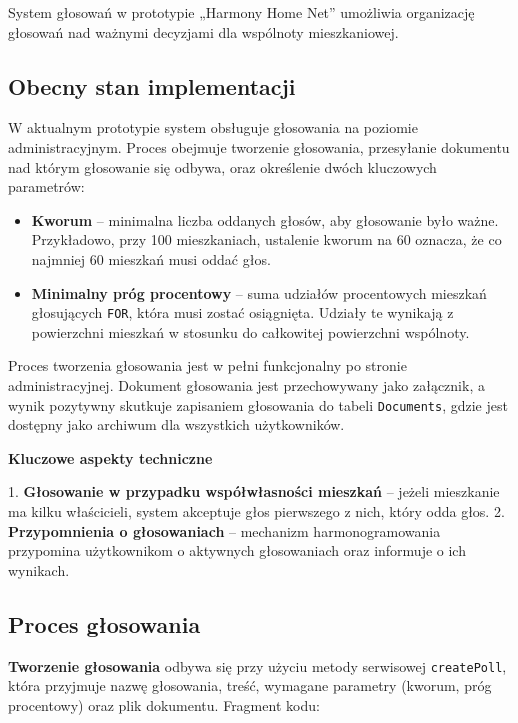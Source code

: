 System głosowań w prototypie „Harmony Home Net” umożliwia organizację głosowań nad ważnymi decyzjami dla wspólnoty mieszkaniowej. 

\subsection{Obecny stan implementacji}

W aktualnym prototypie system obsługuje głosowania na poziomie administracyjnym. Proces obejmuje tworzenie głosowania, przesyłanie dokumentu nad którym głosowanie się odbywa, oraz określenie dwóch kluczowych parametrów:
\begin{itemize}
    \item \textbf{Kworum} -- minimalna liczba oddanych głosów, aby głosowanie było ważne. Przykładowo, przy 100 mieszkaniach, ustalenie kworum na 60 oznacza, że co najmniej 60 mieszkań musi oddać głos.
    \item \textbf{Minimalny próg procentowy} -- suma udziałów procentowych mieszkań głosujących \texttt{FOR}, która musi zostać osiągnięta. Udziały te wynikają z powierzchni mieszkań w stosunku do całkowitej powierzchni wspólnoty.
\end{itemize}

Proces tworzenia głosowania jest w pełni funkcjonalny po stronie administracyjnej. Dokument głosowania jest przechowywany jako załącznik, a wynik pozytywny skutkuje zapisaniem głosowania do tabeli \texttt{Documents}, gdzie jest dostępny jako archiwum dla wszystkich użytkowników.

\textbf{Kluczowe aspekty techniczne}

1. \textbf{Głosowanie w przypadku współwłasności mieszkań} -- jeżeli mieszkanie ma kilku właścicieli, system akceptuje głos pierwszego z nich, który odda głos.
2. \textbf{Przypomnienia o głosowaniach} -- mechanizm harmonogramowania przypomina użytkownikom o aktywnych głosowaniach oraz informuje o ich wynikach.

\subsection{Proces głosowania}

\textbf{Tworzenie głosowania} odbywa się przy użyciu metody serwisowej \texttt{createPoll}, która przyjmuje nazwę głosowania, treść, wymagane parametry (kworum, próg procentowy) oraz plik dokumentu. Fragment kodu:

